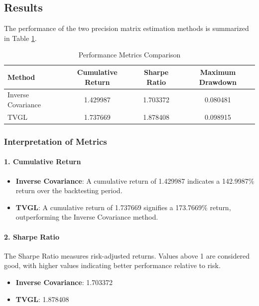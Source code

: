 \documentclass{article}
\begin{document}
\subsection{Results}

The performance of the two precision matrix estimation methods is summarized in Table \ref{tab:performance}.

\begin{table}[H]
    \centering
    \caption{Performance Metrics Comparison}
    \label{tab:performance}
    \begin{tabular}{lccc}
        \toprule
        \textbf{Method} & \textbf{Cumulative Return} & \textbf{Sharpe Ratio} & \textbf{Maximum Drawdown} \\
        \midrule
        Inverse Covariance & 1.429987 & 1.703372 & 0.080481 \\
        TVGL               & 1.737669 & 1.878408 & 0.098915 \\
        \bottomrule
    \end{tabular}
\end{table}

\subsubsection{Interpretation of Metrics}

\paragraph{1. Cumulative Return}

\begin{itemize}
    \item \textbf{Inverse Covariance}: A cumulative return of 1.429987 indicates a 142.9987\% return over the backtesting period.
    \item \textbf{TVGL}: A cumulative return of 1.737669 signifies a 173.7669\% return, outperforming the Inverse Covariance method.
\end{itemize}

\paragraph{2. Sharpe Ratio}

The Sharpe Ratio measures risk-adjusted returns. Values above 1 are considered good, with higher values indicating better performance relative to risk.

\begin{itemize}
    \item \textbf{Inverse Covariance}: 1.703372
    \item \textbf{TVGL}: 1.878408
\end{itemize}
\end{document}
